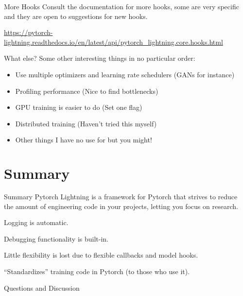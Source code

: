 \documentclass[aspectratio=169]{beamer}
\begin{document}
	\begin{frame}{More Hooks}
		Consult the documentation for more hooks, some are very specific and they are open to suggestions for new hooks. 

		\url{https://pytorch-lightning.readthedocs.io/en/latest/api/pytorch_lightning.core.hooks.html}

	\end{frame}

	\begin{frame}{What else?}
		Some other interesting things in no particular order:
		\begin{itemize}
			\item Use multiple optimizers and learning rate schedulers (GANs for instance)
			\item Profiling performance (Nice to find bottlenecks)
			\item GPU training is easier to do (Set one flag)
			\item Distributed training (Haven't tried this myself)
			\item Other things I have no use for but you might!
		\end{itemize}
	\end{frame}

	\section{Summary}

	\begin{frame}{Summary}
		Pytorch Lightning is a framework for Pytorch that strives to reduce the amount of engineering code in your projects, letting you focus on research.

		Logging is automatic.

		Debugging functionality is built-in.

		Little flexibility is lost due to flexible callbacks and model hooks.

		``Standardizes'' training code in Pytorch (to those who use it).
	\end{frame}

	\begin{frame}[standout]
		Questions and Discussion
	\end{frame}
\end{document}
